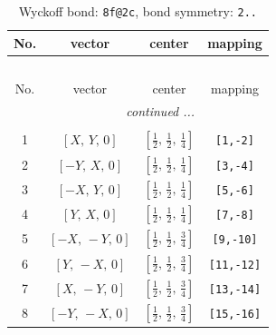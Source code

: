 \documentclass[fleqn,8pt]{jsarticle}
\begin{document}
\begin{longtable}{cccc}
\caption{Wyckoff bond: {\tt 8f@2c}, bond symmetry: {\tt 2..}}
 \\
 \hline \hline
No. & vector & center & mapping \\ \hline \endfirsthead

\multicolumn{3}{l}{\tablename\ \thetable{}} \\
 \hline \hline
No. & vector & center & mapping \\ \hline \endhead

 \hline \hline
\multicolumn{3}{r}{\footnotesize\it continued ...} \\ \endfoot

 \hline \hline
\multicolumn{3}{r}{} \\ \endlastfoot

1 & $\left[ X,\, Y,\, 0 \right]$ & $\left[ \frac{1}{2},\, \frac{1}{2},\, \frac{1}{4} \right]$ & {\tt [1,-2]} \\ \hline
2 & $\left[ - Y,\, X,\, 0 \right]$ & $\left[ \frac{1}{2},\, \frac{1}{2},\, \frac{1}{4} \right]$ & {\tt [3,-4]} \\ \hline
3 & $\left[ - X,\, Y,\, 0 \right]$ & $\left[ \frac{1}{2},\, \frac{1}{2},\, \frac{1}{4} \right]$ & {\tt [5,-6]} \\ \hline
4 & $\left[ Y,\, X,\, 0 \right]$ & $\left[ \frac{1}{2},\, \frac{1}{2},\, \frac{1}{4} \right]$ & {\tt [7,-8]} \\ \hline
5 & $\left[ - X,\, - Y,\, 0 \right]$ & $\left[ \frac{1}{2},\, \frac{1}{2},\, \frac{3}{4} \right]$ & {\tt [9,-10]} \\ \hline
6 & $\left[ Y,\, - X,\, 0 \right]$ & $\left[ \frac{1}{2},\, \frac{1}{2},\, \frac{3}{4} \right]$ & {\tt [11,-12]} \\ \hline
7 & $\left[ X,\, - Y,\, 0 \right]$ & $\left[ \frac{1}{2},\, \frac{1}{2},\, \frac{3}{4} \right]$ & {\tt [13,-14]} \\ \hline
8 & $\left[ - Y,\, - X,\, 0 \right]$ & $\left[ \frac{1}{2},\, \frac{1}{2},\, \frac{3}{4} \right]$ & {\tt [15,-16]} \\
\end{longtable}
\renewcommand{\arraystretch}{1.2}
\end{document}
